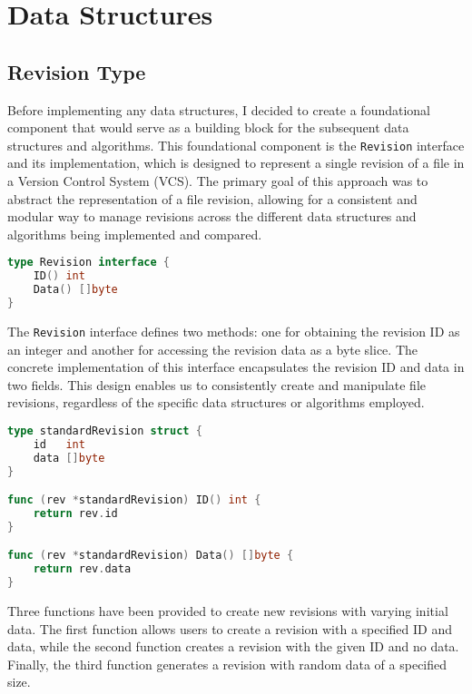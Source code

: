 \section{Data Structures}
\subsection{Revision Type}
Before implementing any data structures, I decided to create a foundational component that would serve as a building block for the subsequent data structures and algorithms. This foundational component is the \lstinline{Revision} interface and its implementation, which is designed to represent a single revision of a file in a Version Control System (VCS). The primary goal of this approach was to abstract the representation of a file revision, allowing for a consistent and modular way to manage revisions across the different data structures and algorithms being implemented and compared.

\begin{lstlisting}[language=Go]
type Revision interface {
	ID() int
	Data() []byte
}
\end{lstlisting}
\medskip

The \lstinline{Revision} interface defines two methods: one for obtaining the revision ID as an integer and another for accessing the revision data as a byte slice. The concrete implementation of this interface encapsulates the revision ID and data in two fields. This design enables us to consistently create and manipulate file revisions, regardless of the specific data structures or algorithms employed.

\begin{lstlisting}[language=Go]
type standardRevision struct {
	id   int
	data []byte
}

func (rev *standardRevision) ID() int {
	return rev.id
}

func (rev *standardRevision) Data() []byte {
	return rev.data
}
\end{lstlisting}
\medskip

Three functions have been provided to create new revisions with varying initial data. The first function allows users to create a revision with a specified ID and data, while the second function creates a revision with the given ID and no data. Finally, the third function generates a revision with random data of a specified size.

